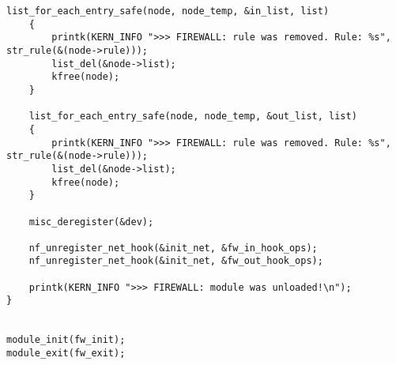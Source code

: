 \begin{lstlisting}[caption = {Загружаемый модуль}, label=lst:code_module]
	list_for_each_entry_safe(node, node_temp, &in_list, list)
	{
		printk(KERN_INFO ">>> FIREWALL: rule was removed. Rule: %s", str_rule(&(node->rule)));
		list_del(&node->list);
		kfree(node);
	}
	
	list_for_each_entry_safe(node, node_temp, &out_list, list)
	{
		printk(KERN_INFO ">>> FIREWALL: rule was removed. Rule: %s", str_rule(&(node->rule)));
		list_del(&node->list);
		kfree(node);
	}
	
	misc_deregister(&dev);
	
	nf_unregister_net_hook(&init_net, &fw_in_hook_ops);
	nf_unregister_net_hook(&init_net, &fw_out_hook_ops);
	
	printk(KERN_INFO ">>> FIREWALL: module was unloaded!\n");
}


module_init(fw_init);
module_exit(fw_exit);
\end{lstlisting}

\pagebreak